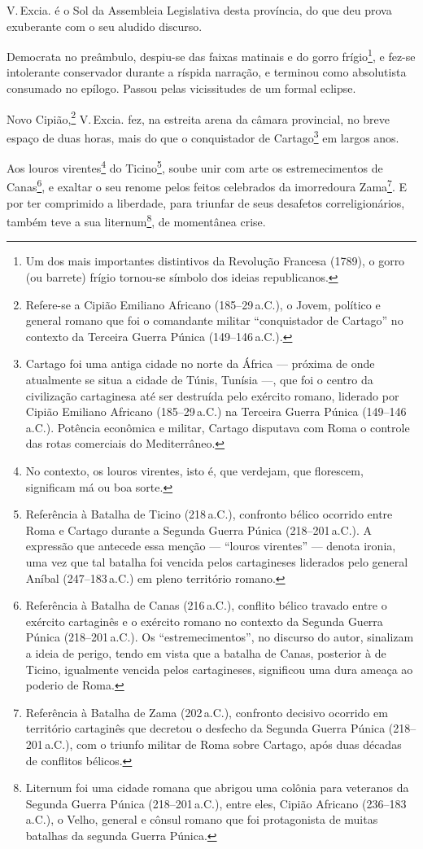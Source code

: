 V.\,Excia. é o Sol da Assembleia Legislativa desta província, do que deu
prova exuberante com o seu aludido discurso.

Democrata no preâmbulo, despiu-se das faixas matinais e do gorro
frígio\footnote{Um dos mais importantes distintivos da Revolução
  Francesa (1789), o gorro (ou barrete) frígio tornou-se símbolo dos
  ideias republicanos.\label{gorro}}, e fez-se intolerante conservador durante a
ríspida narração, e terminou como absolutista consumado no epílogo.
Passou pelas vicissitudes de um formal eclipse.

Novo Cipião,\footnote{Refere-se a Cipião Emiliano Africano (185--29\,a.C.), 
o Jovem, político e general romano que foi o comandante militar
  ``conquistador de Cartago'' no contexto da Terceira Guerra Púnica
  (149--146\,a.C.).} V.\,Excia. fez, na estreita arena da câmara
provincial, no breve espaço de duas horas, mais do que o conquistador de
Cartago\footnote{Cartago foi uma antiga cidade no norte da África ---
  próxima de onde atualmente se situa a cidade de Túnis, Tunísia ---, que
  foi o centro da civilização cartaginesa até ser destruída pelo
  exército romano, liderado por Cipião Emiliano Africano (185--29\,a.C.) na
  Terceira Guerra Púnica (149--146\,a.C.). Potência econômica e militar,
  Cartago disputava com Roma o controle das rotas comerciais do
  Mediterrâneo.} em largos anos.

Aos louros virentes\footnote{No contexto, os louros virentes, isto é,
  que verdejam, que florescem, significam má ou boa sorte.} do
Ticino\footnote{Referência à Batalha de Ticino (218\,a.C.), confronto
  bélico ocorrido entre Roma e Cartago durante a Segunda Guerra Púnica
  (218--201\,a.C.). A expressão que antecede essa menção --- ``louros
  virentes'' --- denota ironia, uma vez que tal batalha foi vencida pelos
  cartagineses liderados pelo general Aníbal (247--183\,a.C.) em
  pleno território romano.}, soube unir com arte os estremecimentos de
Canas\footnote{Referência à Batalha de Canas (216\,a.C.), conflito
  bélico travado entre o exército cartaginês e o exército romano no
  contexto da Segunda Guerra Púnica (218--201\,a.C.). Os ``estremecimentos'',
  no discurso do autor, sinalizam a ideia de perigo, tendo em vista que
  a batalha de Canas, posterior à de Ticino, igualmente vencida pelos
  cartagineses, significou uma dura ameaça ao poderio de Roma.}, e
exaltar o seu renome pelos feitos celebrados da imorredoura
Zama\footnote{Referência à Batalha de Zama (202\,a.C.), confronto
  decisivo ocorrido em território cartaginês que decretou o desfecho da
  Segunda Guerra Púnica (218--201\,a.C.), com o triunfo militar de Roma
  sobre Cartago, após duas décadas de conflitos bélicos.}. E por ter
comprimido a liberdade, para triunfar de seus desafetos
correligionários, também teve a sua liternum\footnote{Liternum foi uma
  cidade romana que abrigou uma colônia para veteranos da Segunda Guerra
  Púnica (218--201\,a.C.), entre eles, Cipião Africano (236--183\,a.C.), o
  Velho, general e cônsul romano que foi protagonista de muitas batalhas
  da segunda Guerra Púnica.}, de momentânea crise.

